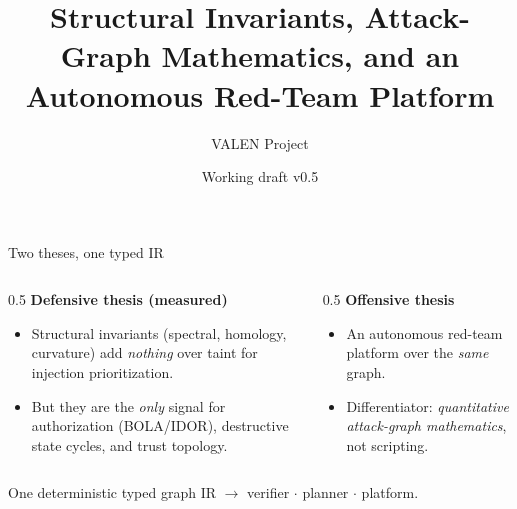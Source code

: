 \documentclass[aspectratio=169,10pt]{beamer}
\title{Structural Invariants, Attack-Graph Mathematics, and an Autonomous Red-Team Platform}
\author{VALEN Project}
\date{Working draft v0.5}
\begin{document}
\begin{frame}
  \titlepage
\end{frame}

\begin{frame}{Two theses, one typed IR}
  \begin{columns}[T]
    \begin{column}{0.5\textwidth}
      \textbf{Defensive thesis (measured)}\\[2mm]
      \begin{itemize}
        \item Structural invariants (spectral, homology, curvature) add
          \emph{nothing} over taint for injection prioritization.
        \item But they are the \emph{only} signal for authorization (BOLA/IDOR),
          destructive state cycles, and trust topology.
      \end{itemize}
    \end{column}
    \begin{column}{0.5\textwidth}
      \textbf{Offensive thesis}\\[2mm]
      \begin{itemize}
        \item An autonomous red-team platform over the \emph{same} graph.
        \item Differentiator: \emph{quantitative attack-graph mathematics},
          not scripting.
      \end{itemize}
    \end{column}
  \end{columns}
  \vfill
  \centering\small One deterministic typed graph IR $\to$ verifier $\cdot$ planner $\cdot$ platform.
\end{frame}
\end{document}
